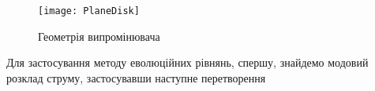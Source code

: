 \begin{figure}[htbp] \begin{center}
\texttt{[image: PlaneDisk]}
\caption{Геометрія випромінювача} \label{fig:pdisk}
\end{center} \end{figure}
%
%
%
Для застосування методу еволюційних рівнянь, спершу, знайдемо модовий 
розклад струму, застосувавши наступне перетворення

